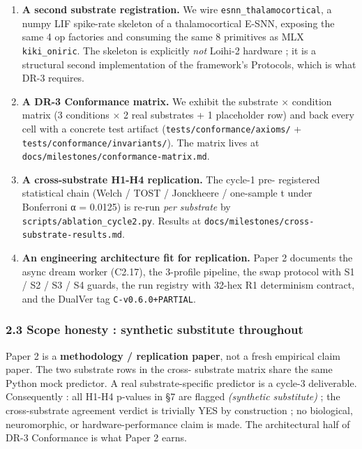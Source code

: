 \documentclass[
]{article}
\providecommand{\tightlist}{%
  \setlength{\itemsep}{0pt}\setlength{\parskip}{0pt}}
\begin{document}
\begin{enumerate}
\def\labelenumi{\arabic{enumi}.}
\tightlist
\item
  \textbf{A second substrate registration.} We wire
  \texttt{esnn\_thalamocortical}, a numpy LIF spike-rate skeleton of a
  thalamocortical E-SNN, exposing the same 4 op factories and consuming
  the same 8 primitives as MLX \texttt{kiki\_oniric}. The skeleton is
  explicitly \emph{not} Loihi-2 hardware ; it is a structural second
  implementation of the framework's Protocols, which is what DR-3
  requires.
\item
  \textbf{A DR-3 Conformance matrix.} We exhibit the substrate ×
  condition matrix (3 conditions × 2 real substrates + 1 placeholder
  row) and back every cell with a concrete test artifact
  (\texttt{tests/conformance/axioms/} +
  \texttt{tests/conformance/invariants/}). The matrix lives at
  \texttt{docs/milestones/conformance-matrix.md}.
\item
  \textbf{A cross-substrate H1-H4 replication.} The cycle-1 pre-
  registered statistical chain (Welch / TOST / Jonckheere / one-sample t
  under Bonferroni α = 0.0125) is re-run \emph{per substrate} by
  \texttt{scripts/ablation\_cycle2.py}. Results at
  \texttt{docs/milestones/cross-substrate-results.md}.
\item
  \textbf{An engineering architecture fit for replication.} Paper 2
  documents the async dream worker (C2.17), the 3-profile pipeline, the
  swap protocol with S1 / S2 / S3 / S4 guards, the run registry with
  32-hex R1 determinism contract, and the DualVer tag
  \texttt{C-v0.6.0+PARTIAL}.
\end{enumerate}

\subsubsection{2.3 Scope honesty : synthetic substitute
throughout}\label{scope-honesty-synthetic-substitute-throughout}

Paper 2 is a \textbf{methodology / replication paper}, not a fresh
empirical claim paper. The two substrate rows in the cross- substrate
matrix share the same Python mock predictor. A real substrate-specific
predictor is a cycle-3 deliverable. Consequently : all H1-H4 p-values in
§7 are flagged \emph{(synthetic substitute)} ; the cross-substrate
agreement verdict is trivially YES by construction ; no biological,
neuromorphic, or hardware-performance claim is made. The architectural
half of DR-3 Conformance is what Paper 2 earns.
\end{document}
